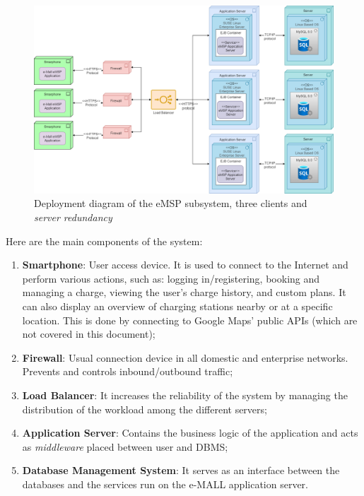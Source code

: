\documentclass[12pt]{report}
\begin{document}
\begin{figure}[ht]
    \centering
    \includegraphics[width =1.1\textwidth]{assets/high_level_deployment_diagram_eMSP.drawio.png}
    \caption{Deployment diagram of the eMSP subsystem, three clients and \emph{server redundancy}}
    \label{fig:my_label2}
\end{figure}

\noindent Here are the main components of the system:

\begin{enumerate}[C1:] 
    \item\textbf{Smartphone}: User access device. It is used to connect to the Internet and perform various actions, such as: logging in/registering, booking and managing a charge, viewing the user's charge history, and custom plans. It can also display an overview of charging stations nearby or at a specific location. This is done by connecting to Google Maps' public APIs (which are not covered in this document);
    \item\textbf{Firewall}: Usual connection device in all domestic and enterprise networks. Prevents and controls inbound/outbound traffic;
    \item\textbf{Load Balancer}: It increases the reliability of the system by managing the distribution of the workload among the different servers;
    \item\textbf{Application Server}: Contains the business logic of the application and acts as \emph{middleware} placed between user and DBMS;
    \item\textbf{Database Management System}: It serves as an interface between the databases and the services run on the e-MALL application server.
\end{enumerate}
\end{document}
